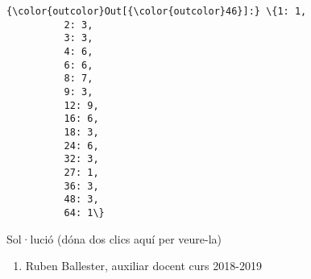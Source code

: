 \documentclass[11pt]{article}
\providecommand{\tightlist}{%
      \setlength{\itemsep}{0pt}\setlength{\parskip}{0pt}}
\begin{document}
\begin{Verbatim}[commandchars=\\\{\}]
{\color{outcolor}Out[{\color{outcolor}46}]:} \{1: 1,
          2: 3,
          3: 3,
          4: 6,
          6: 6,
          8: 7,
          9: 3,
          12: 9,
          16: 6,
          18: 3,
          24: 6,
          32: 3,
          27: 1,
          36: 3,
          48: 3,
          64: 1\}
\end{Verbatim}
            
    Sol·lució (dóna dos clics aquí per veure-la)

    \begin{enumerate}
\def\labelenumi{(\alph{enumi})}
\setcounter{enumi}{2}
\tightlist
\item
  Ruben Ballester, auxiliar docent curs 2018-2019
\end{enumerate}


    
    
    
    
\end{document}
